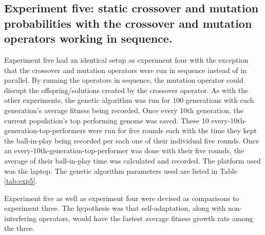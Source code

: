 \documentclass[a4paper,10pt]{article}
\begin{document}
\subsection{Experiment five: static crossover and mutation probabilities with the crossover and mutation operators working in sequence.}

Experiment five had an identical setup as experiment four with the exception that the crossover and mutation operators were run in sequence instead of in parallel. By running the operators in sequence, the mutation operator could disrupt the offspring/solutions created by the crossover operator. As with the other experiments, the genetic algorithm was run for 100 generations with each generation's average fitness being recorded. Once every 10th generation, the current population's top performing genome was saved. These 10 every-10th-generation-top-performers were run for five rounds each with the time they kept the ball-in-play being recorded per each one of their individual five rounds. Once an every-10th-generation-top-performer was done with their five rounds, the average of their ball-in-play time was calculated and recorded. The platform used was the laptop. The genetic algorithm parameters used are listed in Table \ref{tab:exp5}.

Experiment five as well as experiment four were devised as comparisons to experiment three. The hypothesis was that self-adaptation, along with non-interfering operators, would have the fastest average fitness growth rate among the three.
\end{document}
